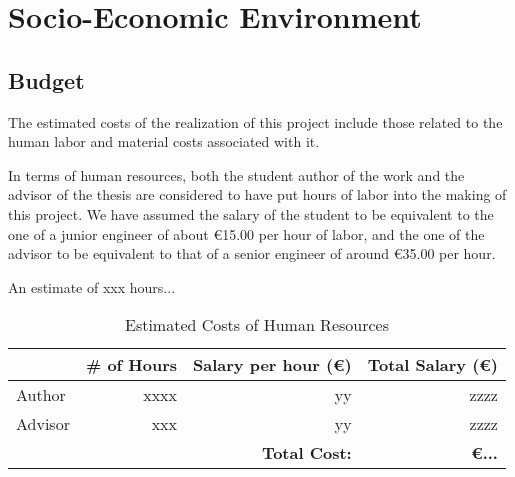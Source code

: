 \documentclass[../main.tex]{subfiles}
\begin{document}
\chapter*{Socio-Economic Environment} \label{chap:socioeconomic}



\section*{Budget} \label{budget}
\vspace*{-0.05cm}

The estimated costs of the realization of this project include those related to the human labor and material costs associated with it.

In terms of human resources, both the student author of the work and the advisor of the thesis are considered to have put hours of labor into the making of this project. We have assumed the salary of the student to be equivalent to the one of a junior engineer of about €15.00 per hour of labor, and the one of the advisor to be equivalent to that of a senior engineer of around €35.00 per hour. 

An estimate of xxx hours...

\begin{table}[H]
    \centering
    \caption{Estimated Costs of Human Resources}
    \label{tab:budget-human_resources}
    \begin{tabular}{lrrr}
    \toprule
    {} &  \# of Hours &  Salary per hour (€) &  Total Salary (€) \\
    \midrule
    Author  &                   xxxx &                    yy &        zzzz \\
    Advisor &                     xxx &                    yy &         zzzz \\
    \bottomrule
    {} &  {} & \textbf{Total Cost:} & \textbf{€...}
    \end{tabular}
\end{table}
\vspace*{-0.4cm}
\end{document}
